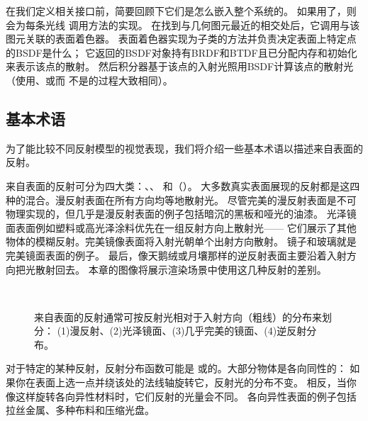 在我们定义相关接口前，简要回顾下它们是怎么嵌入整个系统的。
如果用了，则会为每条光线
调用方法的实现。
在找到与几何图元最近的相交处后，它调用与该图元关联的表面着色器。
表面着色器实现为子类的方法并负责决定表面上特定点的BSDF是什么；
它返回的BSDF对象持有BRDF和BTDF且已分配内存和初始化来表示该点的散射。
然后积分器基于该点的入射光照用BSDF计算该点的散射光
（使用、或而
不是的过程大致相同）。

\subsection{基本术语}\label{sub:基本术语}
为了能比较不同反射模型的视觉表现，我们将介绍一些基本术语以描述来自表面的反射。

来自表面的反射可分为四大类：、、
和（）。
大多数真实表面展现的反射都是这四种的混合。漫反射表面在所有方向均等地散射光。
尽管完美的漫反射表面是不可物理实现的，但几乎是漫反射表面的例子包括暗沉的黑板和哑光的油漆。
光泽镜面表面例如塑料或高光泽涂料优先在一组反射方向上散射光——
它们展示了其他物体的模糊反射。完美镜像表面将入射光朝单个出射方向散射。
镜子和玻璃就是完美镜面表面的例子。
最后，像天鹅绒或月壤那样的逆反射表面主要沿着入射方向把光散射回去。
本章的图像将展示渲染场景中使用这几种反射的差别。
\begin{figure}[htbp]
      \centering
      \\
      \caption{来自表面的反射通常可按反射光相对于入射方向（粗线）的分布来划分：
            (1)漫反射、(2)光泽镜面、(3)几乎完美的镜面、(4)逆反射分布。}
      \label{fig:8.1}
\end{figure}

对于特定的某种反射，反射分布函数可能是
或的。大部分物体是各向同性的：
如果你在表面上选一点并绕该处的法线轴旋转它，反射光的分布不变。
相反，当你像这样旋转各向异性材料时，它们反射的光量会不同。
各向异性表面的例子包括拉丝金属、多种布料和压缩光盘。

